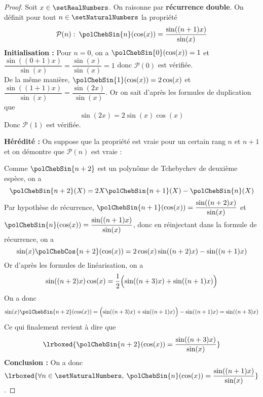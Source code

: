 \begin{proof}
Soit $x \in \setRealNumbers$. On raisonne par \textbf{récurrence double}. On définit pour tout $n \in \setNaturalNumbers$ la propriété
\[
\mathcal{P}(n) : \:\polChebSin{n}(\cos(x))=\dfrac{\sin((n+1)x)}{\sin(x)}
\]
\textbf{Initialisation :} Pour $n=0$, on a $\polChebSin{0}(\cos(x)) = 1$ et $\dfrac{\sin((0+1)x)}{\sin(x)} =\dfrac{\sin(x)}{\sin(x)}  = 1$ donc $\mathcal{P}(0)$ est vérifiée.\\
De la même manière, $\polChebSin{1}(\cos(x)) = 2\cos(x)$ et $\dfrac{\sin((1+1)x)}{\sin(x)}=\dfrac{\sin(2x)}{\sin(x)}$. Or on sait d'après les formules de duplication que 
\[
\sin(2x)=2\sin(x)\cos(x)
\]
Donc $\mathcal{P}(1)$ est vérifiée. 

\textbf{Hérédité :} On suppose que la propriété est vraie pour un certain rang $n$ et $n+1$ et on démontre que $\mathcal{P}(n)$ est vraie :

Comme $\polChebSin{n+2}$ est un polynôme de Tchebychev de deuxième espèce, on a 
\[
\polChebSin{n+2}(X) = 2 X \polChebSin{n+1}(X) - \polChebSin{n}(X)
\]
Par hypothèse de récurrence, $\polChebSin{n+1}(\cos(x)) = \dfrac{\sin((n+2)x)}{\sin(x)}$ et $\polChebSin{n}(\cos(x)) = \dfrac{\sin((n+1)x)}{\sin(x)}$, donc en réinjectant dans la formule de récurrence, on a
\[
\sin(x)\polChebCos{n+2}(\cos(x)) = 2 \cos(x)\sin((n+2)x) - \sin((n+1)x)
\]
Or d'après les formules de linéarisation, on a 
\[
\sin((n+2)x)\cos(x) = \dfrac{1}{2}\Bigl(\sin((n+3)x)+\sin((n+1)x)\Bigr)
\]
On a donc 
\[
\sin(x)\polChebSin{n+2}(\cos(x)) = \Bigl(\sin((n+3)x)+\sin((n+1)x)\Bigr) - \sin((n+1)x) = \sin((n+3)x)
\]
Ce qui finalement revient à dire que
\[
\lrboxed{\polChebSin{n+2}(\cos(x)) = \dfrac{\sin((n+3)x)}{\sin(x)}}
\]
\textbf{Conclusion :} On a donc $\lrboxed{\forall n \in \setNaturalNumbers, \:\polChebSin{n}(\cos(x)) = \dfrac{\sin((n+1)x)}{\sin(x)}}$. 
\end{proof}
